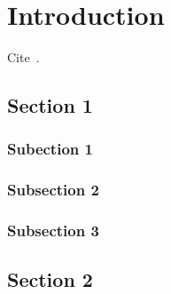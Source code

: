 \chapter{Introduction}
\minitoc
\lipsum[6]
Cite~\cite{tezcan_clefia}.

\section{Section 1}
\lipsum[9]
\subsection{Subection 1}
\lipsum[12]

\subsection{Subsection 2}
\lipsum[16]

\subsection{Subsection 3}
\lipsum[18]

\section{Section 2}
\lipsum[19]


